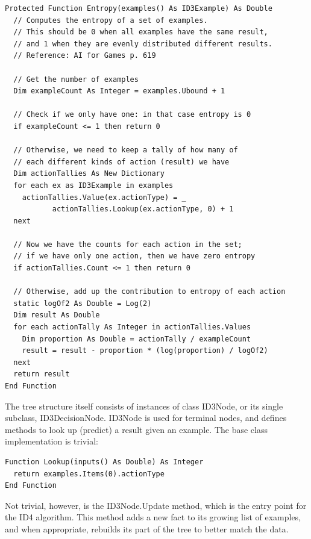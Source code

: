 \documentclass{article}
\begin{document}
\begin{lstlisting}
Protected Function Entropy(examples() As ID3Example) As Double
  // Computes the entropy of a set of examples.
  // This should be 0 when all examples have the same result,
  // and 1 when they are evenly distributed different results.
  // Reference: AI for Games p. 619
  
  // Get the number of examples
  Dim exampleCount As Integer = examples.Ubound + 1
  
  // Check if we only have one: in that case entropy is 0
  if exampleCount <= 1 then return 0
  
  // Otherwise, we need to keep a tally of how many of
  // each different kinds of action (result) we have
  Dim actionTallies As New Dictionary
  for each ex as ID3Example in examples
    actionTallies.Value(ex.actionType) = _
           actionTallies.Lookup(ex.actionType, 0) + 1
  next
  
  // Now we have the counts for each action in the set;
  // if we have only one action, then we have zero entropy
  if actionTallies.Count <= 1 then return 0
  
  // Otherwise, add up the contribution to entropy of each action
  static logOf2 As Double = Log(2)
  Dim result As Double
  for each actionTally As Integer in actionTallies.Values
    Dim proportion As Double = actionTally / exampleCount
    result = result - proportion * (log(proportion) / logOf2)
  next
  return result 
End Function
\end{lstlisting}

The tree structure itself consists of instances of class ID3Node, or its single subclass, ID3DecisionNode.  ID3Node is used for terminal nodes, and defines methods to look up (predict) a result given an example.  The base class implementation is trivial:

\begin{lstlisting}
Function Lookup(inputs() As Double) As Integer
  return examples.Items(0).actionType
End Function
\end{lstlisting}

Not trivial, however, is the ID3Node.Update method, which is the entry point for the ID4 algorithm.  This method adds a new fact to its growing list of examples, and when appropriate, rebuilds its part of the tree to better match the data.
\end{document}
